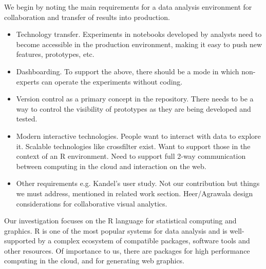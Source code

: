 
We begin by noting the main requirements for a data analysis environment for
collaboration and transfer of results into production.

\begin{itemize}
\item Technology transfer. Experiments in notebooks developed by analysts need to become accessible in the production environment, making it easy to push new features, prototypes, etc.
\item Dashboarding. To support the above, there should be a mode in which non-experts
can operate the experiments without coding.
\item Version control as a primary concept in the repository. There needs to be a way to control the visibility of prototypes as they are being developed and tested.
\item Modern interactive technologies. People want to interact with data to explore it. Scalable technologies like crossfilter exist. Want to support those in the context of an R environment. Need to support full 2-way communication between computing in the cloud and interaction on the web.
\item Other requirements e.g. Kandel's user study. Not our contribution but things we must address, mentioned in related work section. Heer/Agrawala design considerations for collaborative visual analytics.
\end{itemize}

Our investigation focuses on the R language \cite{RCoreTeam:2013:R}
for statistical computing and graphics. R is one of the most popular
systems for data analysis and is well-supported by 
a complex ecosystem of compatible packages, software
tools and other resources. Of importance to us, there are
packages for high performance computing in the cloud,
and for generating web graphics.


